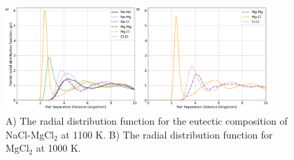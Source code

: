 \documentclass[review]{elsarticle}
\providecommand{\DIFaddbegin}{\protect\color{blue}} %
\newcommand{\DIFaddincludegraphics}[2][]{{\color{blue}\fbox{\DIFOincludegraphics[#1]{#2}}}} %
\DeclareRobustCommand{\DIFaddbegin}{\DIFOaddbegin \let\includegraphics\DIFaddincludegraphics} %
\begin{document}
\begin{figure}[h]
 \centering
 \includegraphics[width=0.9\textwidth]{rdf_from_vasppy.png} 
 \caption{A) The radial distribution function for the eutectic composition of NaCl-MgCl$_2$ at 1100 K. B) The radial distribution function for MgCl$_2$ at 1000 K.}
 \label{fig:rdf}
\end{figure} 






\DIFaddbegin \FloatBarrier
\end{document}
